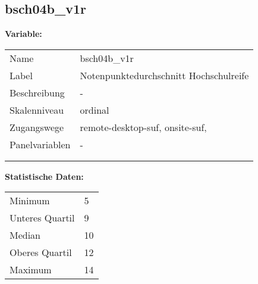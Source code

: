 	
	
	\subsection{bsch04b\_v1r}
	\label{subSection:bsch04b_v1r}

	\noindent\textbf{Variable:}\\
		\begin{tabular}{lL{11.3cm}}
			\label{tableVariable:bsch04b_v1r}
			Name & bsch04b\_v1r \\
			Label & Notenpunktedurchschnitt Hochschulreife \\
			Beschreibung & - \\
			Skalenniveau & ordinal \\
			Zugangswege &
				remote-desktop-suf,
				onsite-suf,
 \\
			Panelvariablen & -
			 \\
			 \\
 \\
		\end{tabular}



		\vspace*{1 cm}
		\noindent\textbf{Statistische Daten:}\\
			\begin{tabular}{ll}
				\label{tableStatistics:bsch04b_v1r}
					Minimum & 5 \\
					Unteres Quartil & 9 \\
					Median & 10 \\
					Oberes Quartil & 12 \\
					Maximum & 14 \\
			\end{tabular}



